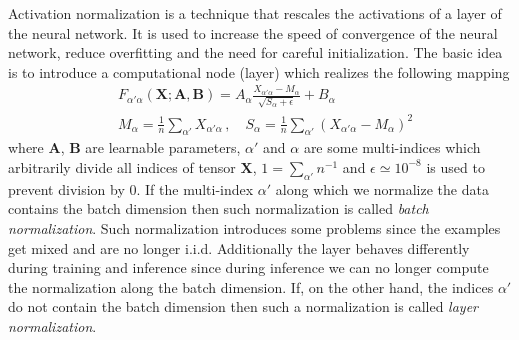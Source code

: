 \documentclass{myclass}
\begin{document}
Activation normalization is a technique that rescales the activations of a layer of the neural
network. It is used to increase the speed of convergence of the neural network, reduce overfitting
and the need for careful initialization. The basic idea is to introduce a computational node (layer)
which realizes the following mapping
\[
\boxed{
\begin{split}
   &F_{\alpha'\alpha}(\bm{X}; \bm{A},\bm{B}) = A_\alpha \frac{X_{\alpha'\alpha} - M_\alpha}{\sqrt{S_\alpha + \epsilon}} + B_\alpha\\
   &M_\alpha = \frac{1}{n} \sum_{\alpha'} X_{\alpha'\alpha}\,,\quad S_\alpha = \frac{1}{n} \sum_{\alpha'} (X_{\alpha'\alpha} - M_\alpha)^2
\end{split}
}
\]
where \(\bm{A}\), \(\bm{B}\) are learnable parameters, \(\alpha'\) and \(\alpha\) are some
multi-indices which arbitrarily divide all indices of tensor \(\bm{X}\), \(1 = \sum_{\alpha'}
n^{-1}\) and \(\epsilon \simeq 10^{-8}\) is used to prevent division by 0. If the multi-index
\(\alpha'\) along which we normalize the data contains the batch dimension then such normalization
is called \emph{batch normalization}. Such normalization introduces some problems since the examples
get mixed and are no longer i.i.d. Additionally the layer behaves differently during training and
inference since during inference we can no longer compute the normalization along the batch
dimension. If, on the other hand, the indices \(\alpha'\) do not contain the batch dimension then
such a normalization is called \emph{layer normalization}.
\end{document}
